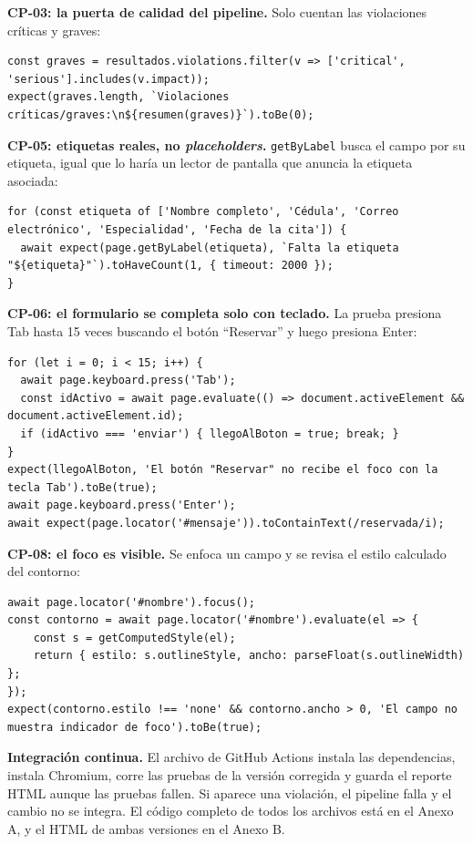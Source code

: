 \documentclass[10pt,letterpaper,onecolumn]{IEEEtran}
\begin{document}
\textbf{CP-03: la puerta de calidad del pipeline.} Solo cuentan las violaciones críticas y graves:

\begin{lstlisting}
const graves = resultados.violations.filter(v => ['critical', 'serious'].includes(v.impact));
expect(graves.length, `Violaciones críticas/graves:\n${resumen(graves)}`).toBe(0);
\end{lstlisting}

\textbf{CP-05: etiquetas reales, no \emph{placeholders}.} \texttt{get\allowbreak{}By\allowbreak{}Label} busca el campo por su etiqueta, igual que lo haría un lector de pantalla que anuncia la etiqueta asociada:

\begin{lstlisting}
for (const etiqueta of ['Nombre completo', 'Cédula', 'Correo electrónico', 'Especialidad', 'Fecha de la cita']) {
  await expect(page.getByLabel(etiqueta), `Falta la etiqueta "${etiqueta}"`).toHaveCount(1, { timeout: 2000 });
}
\end{lstlisting}

\textbf{CP-06: el formulario se completa solo con teclado.} La prueba presiona Tab hasta 15 veces buscando el botón ``Reservar'' y luego presiona Enter:

\begin{lstlisting}
for (let i = 0; i < 15; i++) {
  await page.keyboard.press('Tab');
  const idActivo = await page.evaluate(() => document.activeElement && document.activeElement.id);
  if (idActivo === 'enviar') { llegoAlBoton = true; break; }
}
expect(llegoAlBoton, 'El botón "Reservar" no recibe el foco con la tecla Tab').toBe(true);
await page.keyboard.press('Enter');
await expect(page.locator('#mensaje')).toContainText(/reservada/i);
\end{lstlisting}

\textbf{CP-08: el foco es visible.} Se enfoca un campo y se revisa el estilo calculado del contorno:

\begin{lstlisting}
await page.locator('#nombre').focus();
const contorno = await page.locator('#nombre').evaluate(el => {
    const s = getComputedStyle(el);
    return { estilo: s.outlineStyle, ancho: parseFloat(s.outlineWidth) };
});
expect(contorno.estilo !== 'none' && contorno.ancho > 0, 'El campo no muestra indicador de foco').toBe(true);
\end{lstlisting}

\textbf{Integración continua.} El archivo de GitHub Actions instala las dependencias, instala Chromium, corre las pruebas de la versión corregida y guarda el reporte HTML aunque las pruebas fallen. Si aparece una violación, el pipeline falla y el cambio no se integra. El código completo de todos los archivos está en el Anexo A, y el HTML de ambas versiones en el Anexo B.
\end{document}
